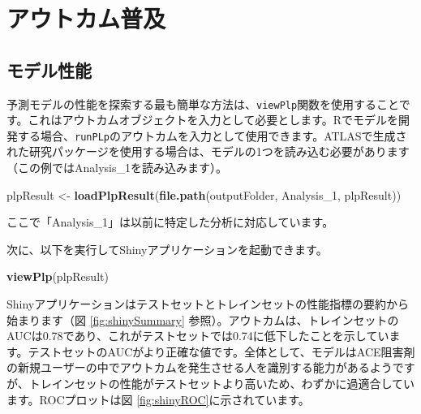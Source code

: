 \documentclass[
  11pt]{book}
\newenvironment{Shaded}{\begin{snugshade}}{\end{snugshade}}
\newcommand{\FunctionTok}[1]{\textcolor[rgb]{0.13,0.29,0.53}{\textbf{#1}}}
\newcommand{\NormalTok}[1]{#1}
\newcommand{\OtherTok}[1]{\textcolor[rgb]{0.56,0.35,0.01}{#1}}
\newcommand{\StringTok}[1]{\textcolor[rgb]{0.31,0.60,0.02}{#1}}
\theoremstyle{definition}
\theoremstyle{definition}
\theoremstyle{definition}
\theoremstyle{definition}
\theoremstyle{remark}
\begin{document}
\section{アウトカム普及}\label{ux30a2ux30a6ux30c8ux30abux30e0ux666eux53ca}

\subsection{モデル性能}\label{ux30e2ux30c7ux30ebux6027ux80fd}

予測モデルの性能を探索する最も簡単な方法は、\texttt{viewPlp}関数を使用することです。これはアウトカムオブジェクトを入力として必要とします。Rでモデルを開発する場合、\texttt{runPLp}のアウトカムを入力として使用できます。ATLASで生成された研究パッケージを使用する場合は、モデルの1つを読み込む必要があります（この例ではAnalysis\_1を読み込みます）。

\begin{Shaded}
\begin{Highlighting}[]
\NormalTok{plpResult }\OtherTok{\textless{}{-}} \FunctionTok{loadPlpResult}\NormalTok{(}\FunctionTok{file.path}\NormalTok{(outputFolder,}
                                     \StringTok{\textquotesingle{}Analysis\_1\textquotesingle{}}\NormalTok{,}
                                     \StringTok{\textquotesingle{}plpResult\textquotesingle{}}\NormalTok{))}
\end{Highlighting}
\end{Shaded}

ここで「Analysis\_1」は以前に特定した分析に対応しています。

次に、以下を実行してShinyアプリケーションを起動できます。

\begin{Shaded}
\begin{Highlighting}[]
\FunctionTok{viewPlp}\NormalTok{(plpResult)}
\end{Highlighting}
\end{Shaded}

Shinyアプリケーションはテストセットとトレインセットの性能指標の要約から始まります（図 \ref{fig:shinySummary} 参照）。アウトカムは、トレインセットのAUCは0.78であり、これがテストセットでは0.74に低下したことを示しています。テストセットのAUCがより正確な値です。全体として、モデルはACE阻害剤の新規ユーザーの中でアウトカムを発生させる人を識別する能力があるようですが、トレインセットの性能がテストセットより高いため、わずかに過適合しています。ROCプロットは図 \ref{fig:shinyROC}に示されています。
\end{document}
